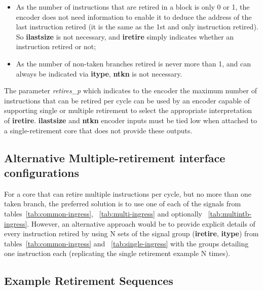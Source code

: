 \begin{itemize}
  \item As the number of instructions that are retired in a block is only 0 or 1, the 
    encoder does not need information to enable it to deduce the address of the last instruction 
    retired (it is the same as the 1st and only instruction retired).  So 
    \textbf{ilastsize} is not necessary, and \textbf{iretire} simply indicates whether an
    instruction retired or not;
  \item As the number of non-taken branches retired is never more than 1, and can always
    be indicated via \textbf{itype}, \textbf{ntkn} is not necessary.
\end{itemize}

The parameter \textit{retires\_p} which indicates to the encoder the maximum number of 
instructions that can be retired per cycle can be used by an encoder capable of supporting single or 
multiple retirement to select the appropriate interpretation of \textbf{iretire}.  
\textbf{ilastsize} and \textbf{ntkn} encoder inputs must be tied low when attached to a single-retirement
core that does not provide these outputs.


\subsection {Alternative Multiple-retirement interface configurations}

For a core that can retire multiple instructions per cycle, but no more than one taken branch, the preferred 
solution is to use one of each of the signals from tables~\ref{tab:common-ingress}, ~\ref{tab:multi-ingress} and 
optionally ~\ref{tab:multintb-ingress}.  However, an alternative approach would be to provide explicit details of every 
instruction retired by using N sets of the signal group (\textbf{iretire}, \textbf{itype}) from 
tables~\ref{tab:common-ingress} and ~\ref{tab:single-ingress} with the groups detailing one instruction each 
(replicating the single retirement example N times).  

\subsection {Example Retirement Sequences}

